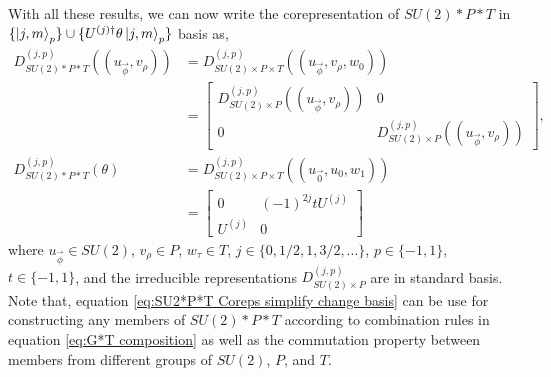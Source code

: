 \documentclass[preprint, 12pt]{revtex4-2}
\numberwithin{equation}{section}
\begin{document}
With all these results, we can now write the corepresentation of $SU(2)\ast P\ast T$ in $\{\ket{j,m}_p\}\cup\{U^{(j)\dagger}\theta\ket{j,m}_p\}$ basis as,
\begin{equation}\label{eq:SU2*P*T Coreps simplify change basis}
    \begin{aligned}
        D_{SU(2)\ast P\ast T}^{(j,p)}((u_{\vec{\phi}}, v_\rho)) &= D_{SU(2)\times P\times T}^{(j,p)}((u_{\vec{\phi}}, v_\rho, w_0)) \\
        &= \begin{bmatrix}
            D_{SU(2)\times P}^{(j,p)}((u_{\vec{\phi}}, v_\rho)) & 0 \\
                0 & D_{SU(2)\times P}^{(j,p)}((u_{\vec{\phi}}, v_\rho))  
            \end{bmatrix}, \\
        D_{SU(2)\ast P\ast T}^{(j,p)}(\theta) &= D_{SU(2)\times P\times T}^{(j,p)}((u_{\vec{0}},u_0,w_1)) \\
        &= \begin{bmatrix}
                0 & (-1)^{2j}tU^{(j)} \\
                U^{(j)} & 0 
            \end{bmatrix}
    \end{aligned}
\end{equation}
where $u_{\vec{\phi}}\in SU(2)$, $v_\rho\in P$, $w_\tau\in T$, $j\in \{0, 1/2, 1, 3/2, ...\}$, $p\in\{-1, 1\}$, $t\in\{-1, 1\}$, and the irreducible representations $D_{SU(2)\times P}^{(j,p)}$ are in standard basis. Note that, equation \ref{eq:SU2*P*T Coreps simplify change basis} can be use for constructing any members of $SU(2)\ast P\ast T$ according to combination rules in equation \ref{eq:G*T composition} as well as the commutation property between members from different groups of $SU(2)$, $P$, and $T$. 
\end{document}

